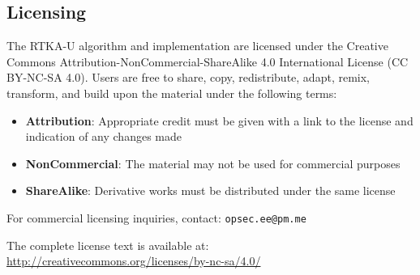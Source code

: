 \documentclass[11pt,a4paper]{article}
\begin{document}
\subsection{Licensing}

The RTKA-U algorithm and implementation are licensed under the Creative Commons Attribution-NonCommercial-ShareAlike 4.0 International License (CC BY-NC-SA 4.0). Users are free to share, copy, redistribute, adapt, remix, transform, and build upon the material under the following terms:

\begin{itemize}
\item \textbf{Attribution}: Appropriate credit must be given with a link to the license and indication of any changes made
\item \textbf{NonCommercial}: The material may not be used for commercial purposes
\item \textbf{ShareAlike}: Derivative works must be distributed under the same license
\end{itemize}

For commercial licensing inquiries, contact: \texttt{opsec.ee@pm.me}

The complete license text is available at: \url{http://creativecommons.org/licenses/by-nc-sa/4.0/}
\end{document}
